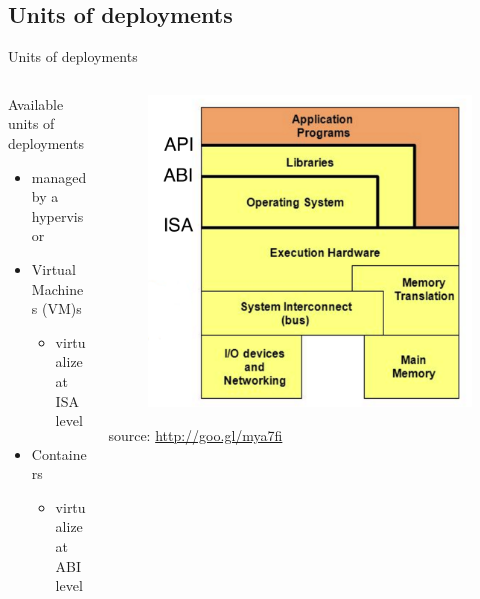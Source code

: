\subsection{Units of deployments}
\begin{frame}{Units of deployments}
	\begin{columns}
		\begin{column}{0.5\textwidth}
			Available units of deployments
			\begin{itemize}
				\item{\footnotesize{managed by a hypervisor}}
				\item{\footnotesize{Virtual Machines (VM)s}}
				\begin{itemize}
					\item{\scriptsize{virtualize at ISA level}}
				\end{itemize}
				\item{\footnotesize{Containers}}
				\begin{itemize}
					\item{\scriptsize{virtualize at ABI level}}
				\end{itemize}
			\end{itemize}
		\end{column}
		\begin{column}{0.5\textwidth}
			\begin{figure}
				\centering{}
				\includegraphics[scale=0.15]{images/virtualization-level.png}
			\end{figure}
			\begin{flushright}
				\tiny{source: \url{http://goo.gl/mya7fi}}
			\end{flushright}
		\end{column}
	\end{columns}
\end{frame}

